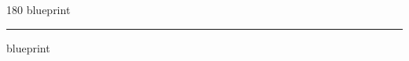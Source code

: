 
\begin{frame}
\begin{center}
\begin{turn}{180}
{\fontsize{2.5cm}{1em}\selectfont blueprint}
\end{turn}
\vspace{1em}\par  
\hrule
\vspace{1em}\par  
{\fontsize{2.5cm}{1em}\selectfont blueprint}
\end{center}
\end{frame}
